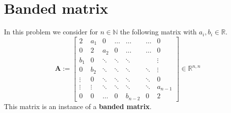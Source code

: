 \documentclass{article}
\begin{document}
\section*{Banded matrix}
In this problem we consider for $n \in \mathbb{N}$ the following matrix with $a_{i}, b_{i} \in \mathbb{R}$.
\begin{equation*}
\mathbf{A} :=
    \begin{bmatrix}
    2 & a_{1} & 0 & \dots & \dots & \dots & 0 \\
    0 & 2 & a_{2} & 0 & \dots & \dots & 0 \\
    b_{1} & 0 & \ddots & \ddots & \ddots & & \vdots \\
    0 & b_{2} & \ddots & \ddots & \ddots & \ddots & \vdots \\
    \vdots & 0 & \ddots & \ddots & \ddots & \ddots & 0\\
    \vdots & \vdots & \ddots & \ddots & \ddots & \ddots & a_{n-1} \\
    0  & 0 & \dots & 0 & b_{n-2} & 0 & 2
    \end{bmatrix} \in \mathbb{R}^{n,n}
\end{equation*}
This matrix is an instance of a \textbf{banded matrix}.
\end{document}
